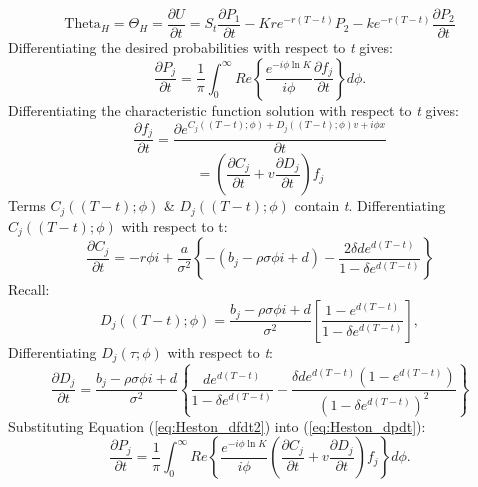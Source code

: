 \documentclass[a4paper]{article}
\begin{document}
\begin{equation}
	\mbox{Theta}_H = \Theta_H = \frac{\partial U}{\partial t} = S_t\frac{\partial P_1}{\partial t} - Kre^{-r(T-t)}P_2 - ke^{-r(T-t)}\frac{\partial P_2}{\partial t}
	\label{eq:Heston_theta_start}
\end{equation}
Differentiating the desired probabilities with respect to \textit{t} gives:
\begin{equation}
	\frac{\partial P_j}{\partial t} = \frac{1}{\pi}\int_0^{\infty} Re \left\{ \frac{e^{-i\phi \ln K}}{i\phi}\frac{\partial f_j}{\partial t} \right\} d\phi.
	\label{eq:Heston_dpdt}
\end{equation}
Differentiating the characteristic function solution with respect to \textit{t} gives:
\begin{equation}
\frac{\partial f_j}{\partial t} = \frac{\partial e^{C_j((T-t);\phi) + D_j((T-t);\phi)v + i\phi x}}{\partial t}
	\label{eq:Heston_dfdt}
\end{equation}
\begin{equation}
	= \left(\frac{\partial C_j}{\partial t} + v\frac{\partial D_j}{\partial t}\right)f_j
	\label{eq:Heston_dfdt2}
\end{equation}
Terms $C_j((T-t);\phi)$ \& $D_j((T-t);\phi)$ contain \textit{t}. Differentiating $C_j((T-t);\phi)$ with respect to t:
\begin{equation}
	\frac{\partial C_j}{\partial t} = -r\phi i + \frac{a}{\sigma^2} \left\{ -(b_j-\rho \sigma \phi i + d) - \frac{2\delta d e^{d(T-t)}}{1-\delta e^{d(T-t)}} \right\}
	\label{eq:Heston_dcdt}
\end{equation}
Recall:
\begin{equation*}
	D_j((T-t);\phi) = \frac{b_j - \rho \sigma \phi i + d}{\sigma^2} \left[ \frac{1 - e^{d (T-t)}}{1 - \delta e^{d (T-t)}} \right],
\end{equation*}
Differentiating $D_j(\tau;\phi)$ with respect to \textit{t}:
\begin{equation}
	\frac{\partial D_j}{\partial t} = \frac{b_j - \rho \sigma \phi i + d}{\sigma^2} \left\{ \frac{de^{d(T-t)}}{1-\delta e^{d(T-t)}} - \frac{\delta d e^{d(T-t)}(1-e^{d(T-t)})}{(1-\delta e^{d(T-t)})^2} \right\}
	\label{eq:Heston_dddt}
\end{equation}
Substituting Equation (\ref{eq:Heston_dfdt2}) into (\ref{eq:Heston_dpdt}):
\begin{equation}
	\frac{\partial P_j}{\partial t} = \frac{1}{\pi}\int_0^{\infty} Re \left\{ \frac{e^{-i\phi \ln K}}{i\phi} \left( \frac{\partial C_j}{\partial t} + v\frac{\partial D_j}{\partial t} \right) f_j \right\} d\phi.
	\label{eq:Heston_dpdt2}
\end{equation}
\end{document}

